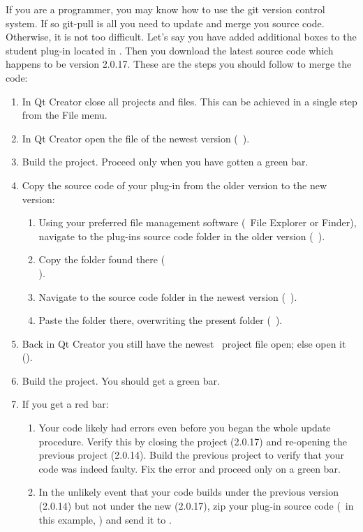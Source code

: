 If you are a programmer, you may know how to use the git version control system. If so git-pull is all you need to update and merge you source code. Otherwise, it is not too difficult. Let's say you have added additional boxes to the student plug-in located in . Then you download the latest source code which happens to be version 2.0.17. These are the steps you should follow to merge the code:
\begin{enumerate}
\item In Qt Creator close all projects and files. This can be achieved in a single step from the File menu.
\item In Qt Creator open the  file of the newest version (\ie\ ).
\item Build the project. Proceed only when you have gotten a green bar.
\item Copy the source code of your plug-in from the older version to the new version:
\begin{enumerate}
\item Using your preferred file management software (\eg\ File Explorer or Finder), navigate to the plug-ins source code folder in the older version (\eg\ ).
\item Copy the  folder found there (\eg\ \\).
\item Navigate to the  source code folder in the newest version (\eg\ ).
\item Paste the  folder there, overwriting the present  folder (\eg\ ).
\end{enumerate}
\item Back in Qt Creator you still have the newest \US\ project file open; else open it ().
\item Build the project. You should get a green bar.
\item If you get a red bar:
\begin{enumerate}
\item Your code likely had errors even before you began the whole update procedure. Verify this by closing the project (2.0.17) and re-opening the previous project (2.0.14). Build the previous project to verify that your code was indeed faulty. Fix the error and proceed only on a green bar.
\item In the unlikely event that your code builds under the previous version (2.0.14) but not under the new (2.0.17), zip your plug-in source code (\ie\ in this example, ) and send it to \USS.
\end{enumerate}
\end{enumerate}

